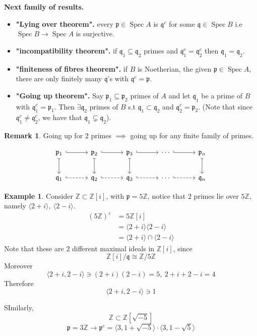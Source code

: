 \documentclass[11pt,a4paper]{article}
\theoremstyle{definition}
\newtheorem{example}[definition]{Example}
\newtheorem{remark}[definition]{Remark}
\theoremstyle{plain}
\theoremstyle{remark}
\newcommand{\Z}{\mathbb{Z}}
\newcommand{\angles}[1]{\langle #1 \rangle}
\newcommand{\Spec}{\operatorname{Spec}}
\begin{document}
\textbf{Next family of results.} 
\begin{itemize}
    \item \textbf{"Lying over theorem".} every $\mathfrak{p} \in \Spec A$ is $\mathfrak{q}^c$ for some $\mathfrak{q} \in \Spec B$ i.e 
    $\Spec B \to \Spec A$ is surjective. 

    \item \textbf{"incompatibility theorem".} if $\mathfrak{q}_1 \subseteq \mathfrak{q}_2$ primes and $\mathfrak{q}_1^c = \mathfrak{q}_2^c$ then 
    $\mathfrak{q}_1 = \mathfrak{q}_2$. 

    \item \textbf{"finiteness of fibres theorem".} if $B$ is Noetherian, the given $\mathfrak{p} \in \Spec A$, there are only finitely many $\mathfrak{q}$'s with 
    $\mathfrak{q}^c  = \mathfrak{p}$. 
    
    \item \textbf{"Going up theorem".} Say $\mathfrak{p}_1 \subseteq \mathfrak{p}_2$ primes of $A$ and let $\mathfrak{q}_1$ be a prime of $B$ with 
    $\mathfrak{q}_1^c = \mathfrak{p}_1$. Then $\exists \mathfrak{q}_2$ primes of $B$ s.t $\mathfrak{q}_1 \subset \mathfrak{q}_2$ and $\mathfrak{q}_2^c = \mathfrak{p}_2$. (Note that 
    since $\mathfrak{q}_1^c \ne \mathfrak{q}_2^c$, we have that $\mathfrak{q}_1 \subsetneq \mathfrak{q}_2$). 
\end{itemize}

\begin{remark}
    Going up for $2$ primes $\implies$ going up for any finite family of primes.
\end{remark}

\[
\begin{tikzcd}[row sep=2.2em, column sep=3.2em]
\mathfrak p_1 \arrow[r, hook] \arrow[d, mapsto]
  & \mathfrak p_2 \arrow[r, hook] \arrow[d, mapsto]
  & \mathfrak p_3 \arrow[r, hook] \arrow[d, mapsto]
  & \cdots \arrow[r, hook]
  & \mathfrak p_n \arrow[d, mapsto] \\
\mathfrak q_1 \arrow[r, hook, dashed]
  & \mathfrak q_2 \arrow[r, hook, dashed]
  & \mathfrak q_3 \arrow[r, hook, dashed]
  & \cdots \arrow[r, hook, dashed]
  & \mathfrak q_n
\end{tikzcd}
\]


\begin{example}
    Consider $\Z \subset \Z[i]$, with $\mathfrak{p} = 5\Z$, notice that $2$ primes lie over $5\Z$, namely 
    $\angles{2+i}, \ \angles{2-i}$. 
    \begin{align*}
        (5\Z)^e &= 5 \Z[i] \\
        &= \angles{2+i} \angles{2-i} \\
        &= \angles{2+i} \cap \angles{2-i}
    \end{align*}
    Note that these are $2$ different maximal ideals in $\Z[i]$, since 
    $$\Z[i] / \mathfrak{q} \cong \Z / 5 \Z$$
    Moreover 
    $$\angles{2+i, 2-i} \ni (2+i)(2-i) = 5, \ 2+i +2 -i = 4$$
    Therefore 
    $$\angles{2+i, 2-i} \ni 1$$

    SImilarly, 
    $$\Z \subset \Z[\sqrt{-5}]$$
    $$\mathfrak{p} = 3 \Z \to \mathfrak{p}^e = \angles{3, 1 + \sqrt{-5}} \cdot \angles{3, 1- \sqrt{5}}$$
\end{example}
\end{document}
